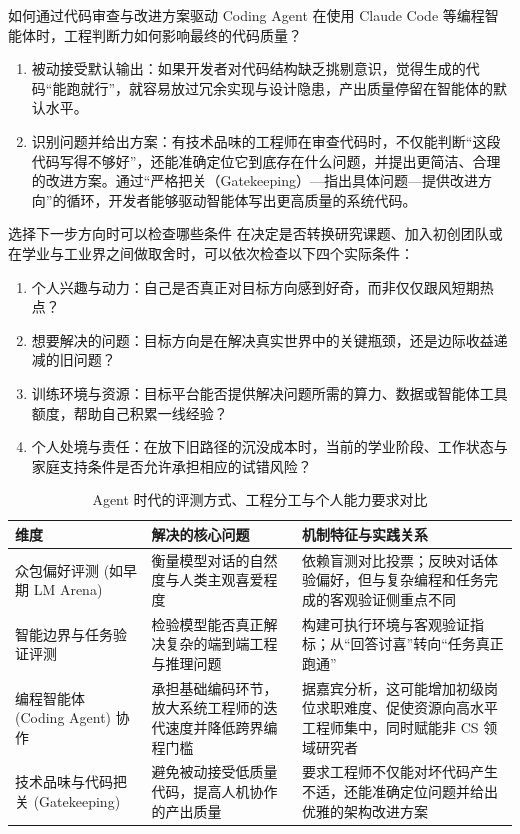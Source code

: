 \documentclass[UTF8,a4paper,11pt,fontset=fandol]{ctexart}
\begin{document}
\begin{importantbox}{如何通过代码审查与改进方案驱动 Coding Agent}
在使用 Claude Code 等编程智能体时，工程判断力如何影响最终的代码质量？
\begin{enumerate}
\item 被动接受默认输出：如果开发者对代码结构缺乏挑剔意识，觉得生成的代码“能跑就行”，就容易放过冗余实现与设计隐患，产出质量停留在智能体的默认水平。
\item 识别问题并给出方案：有技术品味的工程师在审查代码时，不仅能判断“这段代码写得不够好”，还能准确定位它到底存在什么问题，并提出更简洁、合理的改进方案。通过“严格把关（Gatekeeping）—指出具体问题—提供改进方向”的循环，开发者能够驱动智能体写出更高质量的系统代码。
\end{enumerate}
\end{importantbox}
\begin{warningbox}{选择下一步方向时可以检查哪些条件}
在决定是否转换研究课题、加入初创团队或在学业与工业界之间做取舍时，可以依次检查以下四个实际条件：
\begin{enumerate}
\item 个人兴趣与动力：自己是否真正对目标方向感到好奇，而非仅仅跟风短期热点？
\item 想要解决的问题：目标方向是在解决真实世界中的关键瓶颈，还是边际收益递减的旧问题？
\item 训练环境与资源：目标平台能否提供解决问题所需的算力、数据或智能体工具额度，帮助自己积累一线经验？
\item 个人处境与责任：在放下旧路径的沉没成本时，当前的学业阶段、工作状态与家庭支持条件是否允许承担相应的试错风险？
\end{enumerate}
\end{warningbox}
\begin{table}[H]\centering\small
\caption{Agent 时代的评测方式、工程分工与个人能力要求对比}
\begin{tabular}{>{\raggedright\arraybackslash}p{\dimexpr(\linewidth-6\tabcolsep)/3\relax}>{\raggedright\arraybackslash}p{\dimexpr(\linewidth-6\tabcolsep)/3\relax}>{\raggedright\arraybackslash}p{\dimexpr(\linewidth-6\tabcolsep)/3\relax}}
\toprule
维度 & 解决的核心问题 & 机制特征与实践关系\\\midrule
众包偏好评测 (如早期 LM Arena) & 衡量模型对话的自然度与人类主观喜爱程度 & 依赖盲测对比投票；反映对话体验偏好，但与复杂编程和任务完成的客观验证侧重点不同\\[4pt]
智能边界与任务验证评测 & 检验模型能否真正解决复杂的端到端工程与推理问题 & 构建可执行环境与客观验证指标；从“回答讨喜”转向“任务真正跑通”\\[4pt]
编程智能体 (Coding Agent) 协作 & 承担基础编码环节，放大系统工程师的迭代速度并降低跨界编程门槛 & 据嘉宾分析，这可能增加初级岗位求职难度、促使资源向高水平工程师集中，同时赋能非 CS 领域研究者\\[4pt]
技术品味与代码把关 (Gatekeeping) & 避免被动接受低质量代码，提高人机协作的产出质量 & 要求工程师不仅能对坏代码产生不适，还能准确定位问题并给出优雅的架构改进方案\\[4pt]
\bottomrule\end{tabular}\end{table}
\end{document}
